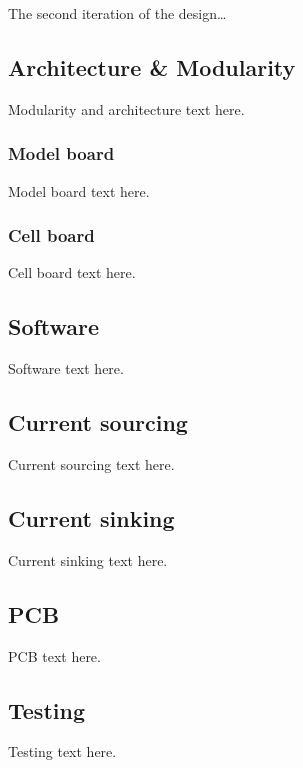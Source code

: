 \IEEEPARstart
{T}{he} second iteration of the design\dots

\subsection{Architecture \& Modularity}
Modularity and architecture text here.
    \subsubsection{Model board}
    Model board text here.
    \subsubsection{Cell board}
    Cell board text here.   

\subsection{Software}
Software text here.
\subsection{Current sourcing}
Current sourcing text here.
\subsection{Current sinking}
Current sinking text here.
\subsection{PCB}
PCB text here.
\subsection{Testing}
Testing text here.